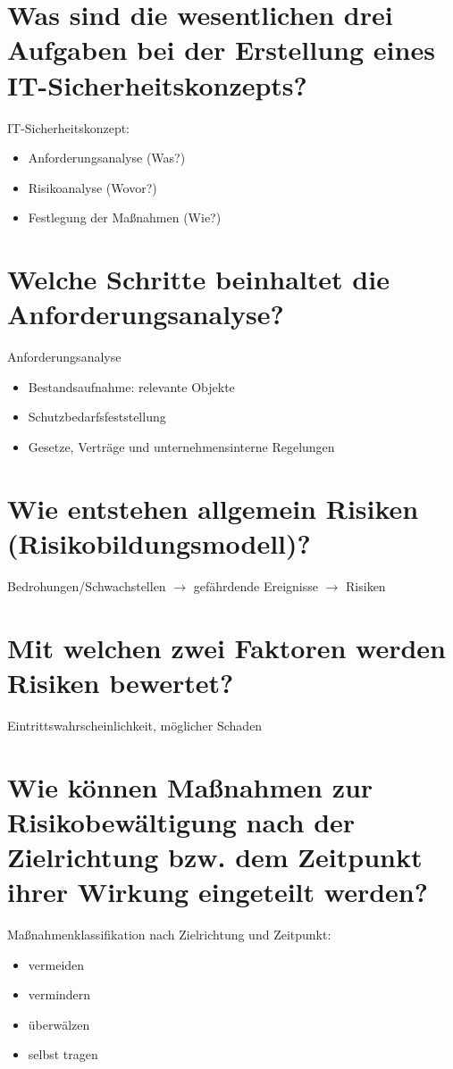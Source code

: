 \documentclass{article}
\begin{document}
	\section*{Was sind die wesentlichen drei Aufgaben bei der Erstellung eines IT-Sicherheitskonzepts?}
	IT-Sicherheitskonzept:
	\begin{itemize}
		\item Anforderungsanalyse (Was?)
		\item Risikoanalyse (Wovor?)
		\item Festlegung der Maßnahmen (Wie?)
	\end{itemize}
	
	\section*{Welche Schritte beinhaltet die Anforderungsanalyse?}
	Anforderungsanalyse
	\begin{itemize}
		\item Bestandsaufnahme: relevante Objekte
		\item Schutzbedarfsfeststellung
		\item Gesetze, Verträge und unternehmensinterne Regelungen
	\end{itemize}
	
	\section*{Wie entstehen allgemein Risiken (Risikobildungsmodell)?}
	Bedrohungen/Schwachstellen $\to$ gefährdende Ereignisse $\to$ Risiken
	
	\section*{Mit welchen zwei Faktoren werden Risiken bewertet?}
	Eintrittswahrscheinlichkeit, möglicher Schaden
	
	\section*{Wie können Maßnahmen zur Risikobewältigung nach der Zielrichtung bzw. dem Zeitpunkt ihrer Wirkung eingeteilt werden?}
	Maßnahmenklassifikation nach Zielrichtung und Zeitpunkt:
	\begin{itemize}
		\item vermeiden
		\item vermindern
		\item überwälzen
		\item selbst tragen
	\end{itemize}
	
\end{document}
